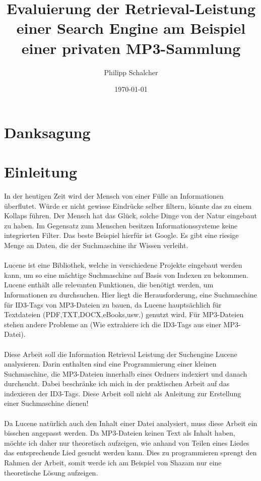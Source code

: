 \documentclass[12pt,a4paper,ngerman]{report}
\author{Philipp Schalcher}
\title{Evaluierung der Retrieval-Leistung einer Search Engine am Beispiel einer privaten MP3-Sammlung}
\date{\today}
\begin{document}

\chapter*{Danksagung}
\tableofcontents
\begin{abstract}

\end{abstract}
\chapter{Einleitung}
In der heutigen Zeit wird der Mensch von einer Fülle an Informationen überflutet. Würde er nicht gewisse Eindrücke selber filtern, könnte das zu einem Kollaps führen. Der Mensch hat das Glück, solche Dinge von der Natur eingebaut zu haben. Im Gegensatz zum Menschen besitzen Informationssysteme keine integrierten Filter. Das beste Beispiel hierfür ist Google. Es gibt eine riesige Menge an Daten, die der Suchmaschine ihr Wissen verleiht.
\\
\\
Lucene ist eine Bibliothek, welche in verschiedene Projekte eingebaut werden kann, um so eine mächtige Suchmaschine auf Basis von Indexen zu bekommen. Lucene enthält alle relevanten Funktionen, die benötigt werden, um Informationen zu durchsuchen. Hier liegt die Herausforderung, eine Suchmaschine für ID3-Tags von MP3-Dateien zu bauen, da Lucene hauptsächlich für Textdateien (PDF,TXT,DOCX,eBooks,usw.) genutzt wird. Für MP3-Dateien stehen andere Probleme an (Wie extrahiere ich die ID3-Tags aus einer MP3-Datei). 
\\
\\
Diese Arbeit soll die Information Retrieval Leistung der Suchengine Lucene analysieren. Darin enthalten sind eine Programmierung einer kleinen Suchmaschine, die MP3-Dateien innerhalb eines Ordners indexiert und danach durchsucht. Dabei beschränke ich mich in der praktischen Arbeit auf das indexieren der ID3-Tags. Diese Arbeit soll nicht als Anleitung zur Erstellung einer Suchmaschine dienen!
\\
\\
Da Lucene natürlich auch den Inhalt einer Datei analysiert, muss diese Arbeit ein bisschen angepasst werden. Da MP3-Dateien keinen Text als Inhalt haben, möchte ich daher nur theoretisch aufzeigen, wie anhand von Teilen eines Liedes das entsprechende Lied gesucht werden kann. Dies zu programmieren sprengt den Rahmen der Arbeit, somit werde ich am Beispiel von Shazam nur eine theoretische Lösung aufzeigen.
\end{document}
